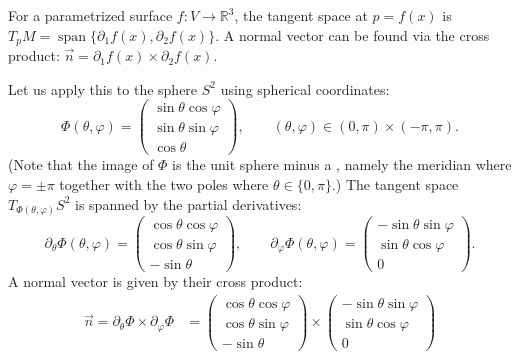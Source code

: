 \begin{example}
\label{ex:tangent_normal_parametrized_sphere}
For a parametrized surface $f : V \to \mathbb{R}^3$, the tangent space at $p = f(x)$ is $T_pM = \operatorname{span}\{\partial_1 f(x), \partial_2 f(x)\}$. A normal vector can be found via the cross product: $\vec{n} = \partial_1 f(x) \times \partial_2 f(x)$.

Let us apply this to the sphere $S^2$ using spherical coordinates:
\[\Phi(\theta,\varphi) = \begin{pmatrix} \sin\theta\cos\varphi \\ \sin\theta\sin\varphi \\ \cos\theta \end{pmatrix}, \qquad (\theta,\varphi) \in (0,\pi) \times (-\pi,\pi).\]
(Note that the image of $\Phi$ is the unit sphere minus a , namely the meridian where $\varphi = \pm\pi$ together with the two poles where $\theta \in \{0,\pi\}$.)
The tangent space $T_{\Phi(\theta,\varphi)} S^2$ is spanned by the partial derivatives:
\[
\partial_\theta \Phi(\theta,\varphi) = \begin{pmatrix} \cos\theta\cos\varphi \\ \cos\theta\sin\varphi \\ -\sin\theta \end{pmatrix}, \qquad
\partial_\varphi \Phi(\theta,\varphi) = \begin{pmatrix} -\sin\theta\sin\varphi \\ \sin\theta\cos\varphi \\ 0 \end{pmatrix}.
\]
A normal vector is given by their cross product:
\begin{align*}
\vec{n} = \partial_\theta \Phi \times \partial_\varphi \Phi
  &= \begin{pmatrix} \cos\theta\cos\varphi \\ \cos\theta\sin\varphi \\ -\sin\theta \end{pmatrix}
     \times
     \begin{pmatrix} -\sin\theta\sin\varphi \\ \sin\theta\cos\varphi \\ 0 \end{pmatrix} \\

\end{align*}
\end{example}
